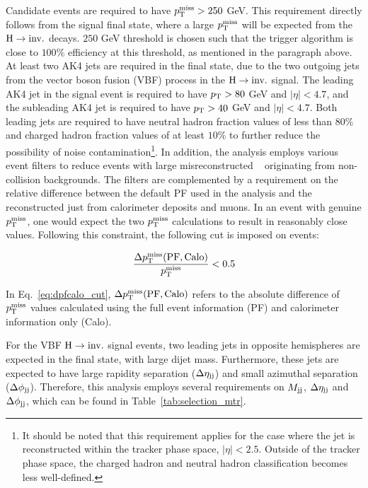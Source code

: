 Candidate events are required to have $p_{\textrm{T}}^{\textrm{miss}} > 250$ GeV. This requirement directly follows from the signal final state,
where a large $p_{\textrm{T}}^{\textrm{miss}}$ will be expected from the $\textrm{H} \rightarrow \textrm{inv.}$ decays. $250$ GeV threshold is chosen such that the trigger
algorithm is close to $100\%$ efficiency at this threshold, as mentioned in the paragraph above.
At least two AK4 jets are required in the final state, due to the two outgoing jets from the vector boson fusion (VBF) process
in the $\textrm{H} \rightarrow \textrm{inv.}$ signal.
The leading AK4 jet in the signal event is required to have $p_{\textrm{T}} > 80$ GeV and $|\eta| < 4.7$, and the subleading AK4 jet is 
required to have $p_{\textrm{T}} > 40$ GeV and $|\eta| < 4.7$.
Both leading jets are required to have neutral hadron fraction values of less than $80\%$ and charged hadron fraction 
values of at least $10\%$ to further reduce the possibility of noise contamination\footnote{It should be noted that
this requirement applies for the case where the jet is reconstructed within the tracker phase space, $|\eta| < 2.5$.
Outside of the tracker phase space, the charged hadron and neutral hadron classification becomes less well-defined.}. 
In addition, the analysis employs 
various event filters to reduce events with large misreconstructed \ptmiss~\cite{Sirunyan:2019kia} originating from 
non-collision backgrounds. The filters are complemented by a requirement on the relative difference between the default 
PF \ptmiss used in the analysis and the \ptmiss reconstructed just from calorimeter deposits and muons. 
In an event with genuine $p_{\textrm{T}}^{\textrm{miss}}$, one would expect the two $p_{\textrm{T}}^{\textrm{miss}}$ calculations to result in reasonably close values.
Following this constraint, the following cut is imposed on events:

\begin{equation}
    \frac{\Delta p_{\textrm{T}}^{\textrm{miss}}(\text{PF},\text{Calo})}{p_{\textrm{T}}^{\textrm{miss}}} < 0.5
    \label{eq:dpfcalo_cut}
\end{equation}

In Eq.~\ref{eq:dpfcalo_cut}, $\Delta p_{\textrm{T}}^{\textrm{miss}}(\text{PF},\text{Calo})$ refers to the absolute difference of $p_{\textrm{T}}^{\textrm{miss}}$ values calculated
using the full event information (PF) and calorimeter information only (Calo).

For the VBF $\textrm{H} \rightarrow \textrm{inv.}$ signal events, two leading jets in opposite hemispheres are expected in the final state, with large dijet mass. 
Furthermore, these jets are expected to have large rapidity separation ($\Delta \eta_{\textrm{jj}}$) and small azimuthal separation ($\Delta \phi_{\textrm{jj}}$). 
Therefore, this analysis employs several requirements on $M_{\textrm{jj}}$, $\Delta \eta_{\textrm{jj}}$ and $\Delta \phi_{\textrm{jj}}$, which can be 
found in Table~\ref{tab:selection_mtr}.


